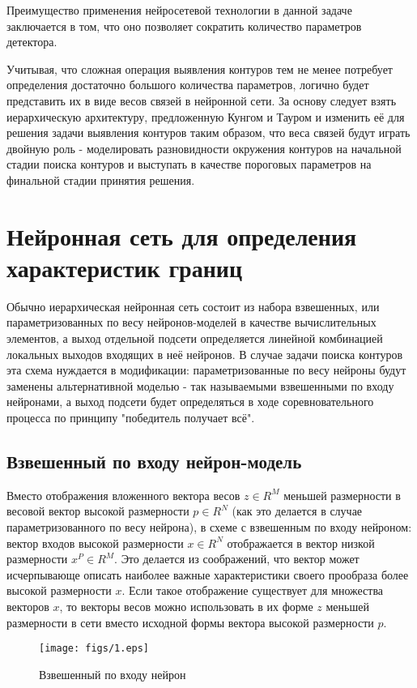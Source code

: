 \documentclass[a4paper,12pt]{report}
\begin{document}
Преимущество применения нейросетевой технологии в данной задаче заключается в том, что оно позволяет сократить количество параметров детектора.

Учитывая, что сложная операция выявления контуров тем не менее потребует определения достаточно большого количества параметров, логично будет представить их в виде весов связей в нейронной сети. За основу следует взять иерархическую архитектуру, предложенную Кунгом и Тауром и изменить её для решения задачи выявления контуров таким образом, что веса связей будут играть двойную роль - моделировать разновидности окружения контуров на начальной стадии поиска контуров и выступать в качестве пороговых параметров на финальной стадии принятия решения. 

\section{Нейронная сеть для определения характеристик границ}

Обычно иерархическая нейронная сеть состоит из набора взвешенных, или параметризованных по весу нейронов-моделей в качестве вычислительных элементов, а выход отдельной подсети определяется линейной комбинацией локальных выходов входящих в неё нейронов. В случае задачи поиска контуров эта схема нуждается в модификации: параметризованные по весу нейроны будут заменены альтернативной моделью - так называемыми взвешенными по входу нейронами, а выход подсети будет определяться в ходе соревновательного процесса по принципу "победитель получает всё".
\subsection{Взвешенный по входу нейрон-модель}
Вместо отображения вложенного вектора весов $z\in R^M$ меньшей размерности в весовой вектор высокой размерности $p\in R^N$ (как это делается в случае параметризованного по весу нейрона), в схеме с взвешенным по входу нейроном: вектор входов высокой размерности $x\in R^N$  отображается в вектор низкой размерности $x^P\in R^M$. Это делается из соображений, что вектор   может исчерпывающе описать наиболее важные характеристики своего прообраза более высокой размерности $x$. Если такое отображение существует для множества векторов $x$, то векторы весов можно использовать в их форме $z$ меньшей размерности  в сети вместо исходной формы вектора высокой размерности $p$.

\begin{center}
\begin{figure}[h]
\begin{center}
\texttt{[image: figs/1.eps]}
\end{center}
\caption{Взвешенный по входу нейрон}
\label{neuron}
\end{figure}
\end{center}
\end{document}
